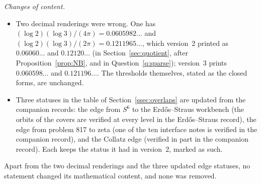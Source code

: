 \emph{Changes of content.}
\begin{itemize}
\item Two decimal renderings were wrong. One has $(\log2)(\log3)/(4\pi)=0.0605982\ldots$ and $(\log2)(\log3)/(2\pi)=0.1211965\ldots$, which version~2 printed as $0.06060\ldots$ and $0.12120\ldots$ (in Section~\ref{sec:quotient}, after Proposition~\ref{prop:NB}, and in Question~\ref{q:sparse}); version~3 prints $0.060598\ldots$ and $0.121196\ldots$. The thresholds themselves, stated as the closed forms, are unchanged.
\item Three statuses in the table of Section~\ref{ssec:overlaps} are updated from the companion records: the edge from $S^6$ to the Erdős--Straus workbench (the orbits of the covers are verified at every level in the Erdős--Straus record), the edge from problem 817 to zeta (one of the ten interface notes is verified in the companion record), and the Collatz edge (verified in part in the companion record). Each keeps the status it had in version~2, marked as such.
\end{itemize}
Apart from the two decimal renderings and the three updated edge statuses, no statement changed its mathematical content, and none was removed.
